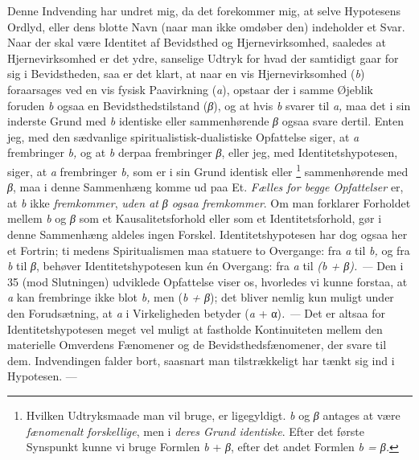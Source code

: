 \documentclass[12pt,a4paper,openany]{book}
\begin{document}
Denne Indvending har undret mig, da det forekommer mig, at selve Hypotesens
Ordlyd, eller dens blotte Navn (naar man ikke omdøber den) indeholder et Svar.
Naar der skal være Identitet af Bevidsthed og Hjernevirksomhed, saaledes at
Hjernevirksomhed er det ydre, sanselige Udtryk for hvad der samtidigt gaar for
sig i Bevidstheden, saa er det klart, at naar en vis Hjernevirksomhed
(\textit{b}) foraarsages ved en vis fysisk Paavirkning (\textit{a}), opstaar
der i samme Øjeblik foruden \textit{b} ogsaa en Bevidsthedstilstand
(\textit{β}), og at hvis \textit{b} svarer til \textit{a,} maa det i sin
inderste Grund med \textit{b} identiske eller sammenhørende \textit{β} ogsaa
svare dertil. Enten jeg, med den sædvanlige spiritualistisk-dualistiske
Opfattelse siger, at \textit{a} frembringer \textit{b,} og at \textit{b} derpaa
frembringer \textit{β}, eller jeg, med Identitetshypotesen, siger, at
\textit{a} frembringer \textit{b,} som er i sin Grund identisk eller%
\footnote[1]{Hvilken Udtryksmaade man vil bruge, er ligegyldigt. \textit{b} og
\textit{β} antages at være \emph{fænomenalt forskellige}, men i \emph{deres
Grund identiske}. Efter det første Synspunkt kunne vi bruge Formlen \textit{b}
+ \textit{β}, efter det andet Formlen \textit{b = β.}} sammenhørende med
\textit{β}, maa i denne Sammenhæng komme ud paa Et. \emph{Fælles for begge
Opfattelser} er, at \textit{b} ikke \emph{fremkommer}, \emph{uden at} \textit{β
ogsaa fremkommer}. Om man forklarer Forholdet mellem \textit{b} og\textit{ β}
som et Kausalitetsforhold eller som et Identitetsforhold, gør i denne
Sammenhæng aldeles ingen Forskel. Identitetshypotesen har dog ogsaa her et
Fortrin; ti medens Spiritualismen maa statuere to Overgange: fra \textit{a} til
\textit{b,} og fra \textit{b} til \textit{β}, behøver Identitetshypotesen kun
én Overgang: fra \textit{a} til \textit{(b + β). ---} Den i 35 (mod Slutningen)
udviklede Opfattelse viser os, hvorledes vi kunne forstaa, at \textit{a} kan
frembringe ikke blot \textit{b,} men (\textit{b + β}); det bliver nemlig kun
muligt under den Forudsætning, at \textit{a} i Virkeligheden betyder
(\textit{a} + α)\textit{. ---} Det er altsaa for Identitetshypotesen meget vel
muligt at fastholde Kontinuiteten mellem den materielle Omverdens Fænomener og
de Bevidsthedsfænomener, der svare til dem. Indvendingen falder bort, saasnart
man tilstrækkeligt har tænkt sig ind i Hypotesen. ---
\end{document}
